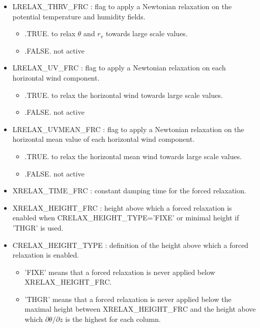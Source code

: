 \begin{itemize}
\item LRELAX\_THRV\_FRC : flag to apply a Newtonian relaxation on the
potential temperature and humidity fields.
\begin{itemize}
\item .TRUE.  to relax $\theta$ and $r_v$ towards large scale values.
\item .FALSE. not active
\end{itemize}

\item LRELAX\_UV\_FRC : flag to apply a Newtonian relaxation on each
horizontal wind component.
\begin{itemize}
\item .TRUE.  to relax the horizontal wind towards large scale values.
\item .FALSE. not active
\end{itemize}

\item LRELAX\_UVMEAN\_FRC : flag to apply a Newtonian relaxation on the horizontal mean value of each
horizontal wind component.
\begin{itemize}
\item .TRUE.  to relax the horizontal mean wind towards large scale values.
\item .FALSE. not active
\end{itemize}

\item XRELAX\_TIME\_FRC : constant damping time for the forced relaxation.

\item XRELAX\_HEIGHT\_FRC : height above which a forced relaxation is enabled
when CRELAX\_HEIGHT\_TYPE='FIXE' or minimal height if 'THGR' is used.

\item CRELAX\_HEIGHT\_TYPE : definition of the height above which a forced
relaxation is enabled.
\begin{itemize}
\item 'FIXE' means that a forced relaxation is never applied below
XRELAX\_HEIGHT\_FRC.
\item 'THGR' means that a forced relaxation is never applied below the maximal
height between XRELAX\_HEIGHT\_FRC and the height above which $\partial \theta
/ \partial z$ is the highest for each column.
\end{itemize}


\end{itemize}
